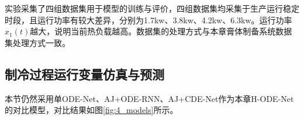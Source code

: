 实验采集了四组数据集用于模型的训练与评价，四组数据集均采集于生产运行稳定时段，且运行功率有较大差异，分别为1.7kw、3.8kw、4.2kw、6.3kw。运行功率$x_1(t)$越大，说明当前热负载越高。数据集的处理方式与本章膏体制备系统数据集处理方式一致。
\subsection{制冷过程运行变量仿真与预测}
本节仍然采用单ODE-Net、AJ+ODE-RNN、AJ+CDE-Net作为本章H-ODE-Net的对比模型，对比结果如图\ref{fig:4_models}所示。
\begin{figure}
    \centering
    \hspace{-0.2in}
    \hspace{-0.08in}
    \hspace{-0.08in}
    \hspace{-0.08in}

\end{figure}
